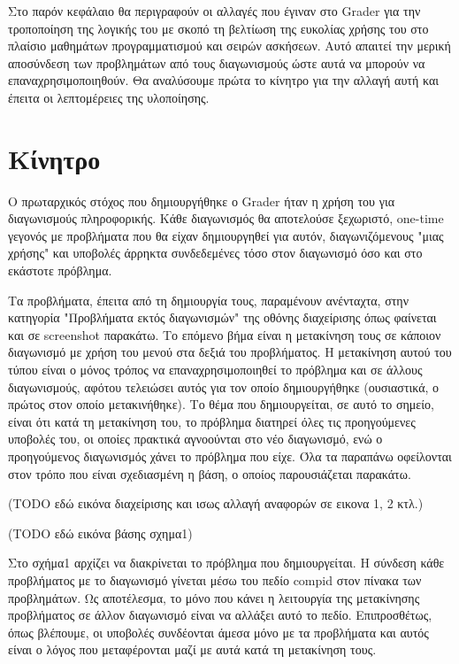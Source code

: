 \documentclass[diploma]{softlab-thesis}
\begin{document}
Στο παρόν κεφάλαιο θα περιγραφούν οι αλλαγές που έγιναν στο Grader για την
τροποποίηση της λογικής του με σκοπό τη βελτίωση της ευκολίας χρήσης του
στο πλαίσιο μαθημάτων προγραμματισμού και σειρών ασκήσεων. Αυτό απαιτεί την
μερική αποσύνδεση των προβλημάτων από τους διαγωνισμούς ώστε αυτά να μπορούν
να επαναχρησιμοποιηθούν. Θα αναλύσουμε πρώτα το κίνητρο για την αλλαγή αυτή
και έπειτα οι λεπτομέρειες της υλοποίησης.

\section{Κίνητρο}

Ο πρωταρχικός στόχος που δημιουργήθηκε ο Grader ήταν η χρήση του για διαγωνισμούς
πληροφορικής. Κάθε διαγωνισμός θα αποτελούσε ξεχωριστό, one-time γεγονός με
προβλήματα που θα είχαν δημιουργηθεί για αυτόν, διαγωνιζόμενους "μιας χρήσης"
και υποβολές άρρηκτα συνδεδεμένες τόσο στον διαγωνισμό όσο και στο εκάστοτε
πρόβλημα.

\bigskip

Τα προβλήματα, έπειτα από τη δημιουργία τους, παραμένουν ανένταχτα, στην κατηγορία
"Προβλήματα εκτός διαγωνισμών" της οθόνης διαχείρισης
όπως φαίνεται και σε screenshot παρακάτω. Το επόμενο βήμα είναι η μετακίνηση τους
σε κάποιον διαγωνισμό με χρήση του μενού στα δεξιά του προβλήματος. Η μετακίνηση
αυτού του τύπου είναι ο μόνος τρόπος να επαναχρησιμοποιηθεί το πρόβλημα και σε
άλλους διαγωνισμούς, αφότου τελειώσει αυτός για τον οποίο δημιουργήθηκε
(ουσιαστικά, ο πρώτος στον οποίο μετακινήθηκε). Το θέμα που δημιουργείται, σε αυτό
το σημείο, είναι ότι κατά τη μετακίνηση του, το πρόβλημα διατηρεί όλες τις
προηγούμενες υποβολές του, οι οποίες πρακτικά αγνοούνται στο νέο διαγωνισμό, ενώ
ο προηγούμενος διαγωνισμός χάνει το πρόβλημα που είχε. Όλα τα παραπάνω οφείλονται
στον τρόπο που είναι σχεδιασμένη η βάση, ο οποίος παρουσιάζεται παρακάτω.

\bigskip

(TODO εδώ εικόνα διαχείρισης και ισως αλλαγή αναφορών σε εικονα 1, 2 κτλ.)

\bigskip

(TODO εδώ εικόνα βάσης σχημα1)

\bigskip

Στο σχήμα1 αρχίζει να διακρίνεται το πρόβλημα που δημιουργείται. Η σύνδεση
κάθε προβλήματος με το διαγωνισμό γίνεται μέσω του πεδίο compid στον πίνακα
των προβλημάτων. Ως αποτέλεσμα, το μόνο που κάνει η λειτουργία της μετακίνησης
προβλήματος σε άλλον διαγωνισμό είναι να αλλάξει αυτό το πεδίο. Επιπροσθέτως,
όπως βλέπουμε, οι υποβολές συνδέονται άμεσα μόνο με τα προβλήματα και αυτός
είναι ο λόγος που μεταφέρονται μαζί με αυτά κατά τη μετακίνηση τους.
\end{document}
